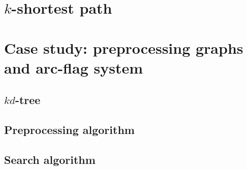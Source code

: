 \documentclass[oneside]{book}
\begin{document}
\section{$k$-shortest path}

\section{Case study: preprocessing graphs and arc-flag system}

\subsection{$kd$-tree}

\subsection{Preprocessing algorithm}

\subsection{Search algorithm}
\end{document}
